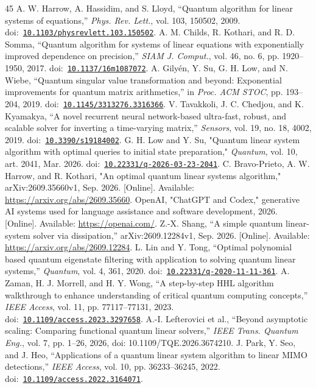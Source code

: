 \documentclass{ieeeaccess}
\newcommand{\refdoi}[1]{doi:~\href{https://doi.org/#1}{\nolinkurl{#1}}}
\begin{document}
\begin{thebibliography}{45}
 A. W. Harrow, A. Hassidim, and S. Lloyd, ``Quantum algorithm for linear systems of equations,'' \emph{Phys. Rev. Lett.}, vol. 103, 150502, 2009. \refdoi{10.1103/physrevlett.103.150502}.
 A. M. Childs, R. Kothari, and R. D. Somma, ``Quantum algorithm for systems of linear equations with exponentially improved dependence on precision,'' \emph{SIAM J. Comput.}, vol. 46, no. 6, pp. 1920--1950, 2017. \refdoi{10.1137/16m1087072}.
 A. Gily\'en, Y. Su, G. H. Low, and N. Wiebe, ``Quantum singular value transformation and beyond: Exponential improvements for quantum matrix arithmetics,'' in \emph{Proc. ACM STOC}, pp. 193--204, 2019. \refdoi{10.1145/3313276.3316366}.
 V. Tavakkoli, J. C. Chedjou, and K. Kyamakya, ``A novel recurrent neural network-based ultra-fast, robust, and scalable solver for inverting a time-varying matrix,'' \emph{Sensors}, vol. 19, no. 18, 4002, 2019. \refdoi{10.3390/s19184002}.
 G. H. Low and Y. Su, "Quantum linear system algorithm with optimal queries to initial state preparation," \emph{Quantum}, vol. 10, art. 2041, Mar. 2026. \refdoi{10.22331/q-2026-03-23-2041}.
 C. Bravo-Prieto, A. W. Harrow, and R. Kothari, "An optimal quantum linear systems algorithm," arXiv:2609.35660v1, Sep. 2026. [Online]. Available: \url{https://arxiv.org/abs/2609.35660}.
 OpenAI, "ChatGPT and Codex," generative AI systems used for language assistance and software development, 2026. [Online]. Available: \url{https://openai.com/}.
 Z.-X. Shang, ``A simple quantum linear-system solver via dissipation,'' arXiv:2609.12284v1, Sep. 2026. [Online]. Available: \url{https://arxiv.org/abs/2609.12284}.
 L. Lin and Y. Tong, ``Optimal polynomial based quantum eigenstate filtering with application to solving quantum linear systems,'' \emph{Quantum}, vol. 4, 361, 2020. \refdoi{10.22331/q-2020-11-11-361}.
 A. Zaman, H. J. Morrell, and H. Y. Wong, ``A step-by-step HHL algorithm walkthrough to enhance understanding of critical quantum computing concepts,'' \emph{IEEE Access}, vol. 11, pp. 77117--77131, 2023. \refdoi{10.1109/access.2023.3297658}.
 A.-I. Lefterovici et al., ``Beyond asymptotic scaling: Comparing functional quantum linear solvers,'' \emph{IEEE Trans. Quantum Eng.}, vol. 7, pp. 1--26, 2026, doi: 10.1109/TQE.2026.3674210.
 J. Park, Y. Seo, and J. Heo, ``Applications of a quantum linear system algorithm to linear MIMO detections,'' \emph{IEEE Access}, vol. 10, pp. 36233--36245, 2022. \refdoi{10.1109/access.2022.3164071}.

\end{thebibliography}
\end{document}
